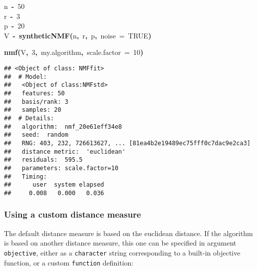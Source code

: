 \documentclass[a4paper]{article}\usepackage{graphicx, color}
\makeatletter
\newcommand{\hlnumber}[1]{\textcolor[rgb]{0,0,0}{#1}}%
\newcommand{\hlfunctioncall}[1]{\textcolor[rgb]{0.501960784313725,0,0.329411764705882}{\textbf{#1}}}%
\newcommand{\hlkeyword}[1]{\textcolor[rgb]{0,0,0}{\textbf{#1}}}%
\newcommand{\hlargument}[1]{\textcolor[rgb]{0.690196078431373,0.250980392156863,0.0196078431372549}{#1}}%
\newcommand{\hlassignement}[1]{\textcolor[rgb]{0,0,0}{\textbf{#1}}}%
\newcommand{\hlsymbol}[1]{\textcolor[rgb]{0,0,0}{#1}}%
\newcommand{\hlstd}[1]{\textcolor[rgb]{0,0,0}{#1}}%
\newenvironment{kframe}{%
 \def\FrameCommand##1{\hskip\@totalleftmargin \hskip-\fboxsep
 \colorbox{shadecolor}{##1}\hskip-\fboxsep
     \hskip-\linewidth \hskip-\@totalleftmargin \hskip\columnwidth}%
 \MakeFramed {\advance\hsize-\width
   \@totalleftmargin\z@ \linewidth\hsize
   \@setminipage}}%
 {\par\unskip\endMakeFramed}
\newenvironment{knitrout}{}{} %
\let\code=\texttt
\makeatother
\begin{document}
\begin{knitrout}
\color{fgcolor}\begin{kframe}
\begin{flushleft}
\ttfamily\noindent
\hlsymbol{n}{\ }\hlassignement{\usebox{\hlnormalsizeboxlessthan}-}{\ }\hlnumber{50}\hspace*{\fill}\\
\hlstd{}\hlsymbol{r}{\ }\hlassignement{\usebox{\hlnormalsizeboxlessthan}-}{\ }\hlnumber{3}\hspace*{\fill}\\
\hlstd{}\hlsymbol{p}{\ }\hlassignement{\usebox{\hlnormalsizeboxlessthan}-}{\ }\hlnumber{20}\hspace*{\fill}\\
\hlstd{}\hlsymbol{V}{\ }\hlassignement{\usebox{\hlnormalsizeboxlessthan}-}{\ }\hlfunctioncall{syntheticNMF}\hlkeyword{(}\hlsymbol{n}\hlkeyword{,}{\ }\hlsymbol{r}\hlkeyword{,}{\ }\hlsymbol{p}\hlkeyword{,}{\ }\hlargument{noise}{\ }\hlargument{=}{\ }\hlnumber{TRUE}\hlkeyword{)}\mbox{}
\normalfont
\end{flushleft}
\end{kframe}
\end{knitrout}


\begin{knitrout}
\color{fgcolor}\begin{kframe}
\begin{flushleft}
\ttfamily\noindent
\hlfunctioncall{nmf}\hlkeyword{(}\hlsymbol{V}\hlkeyword{,}{\ }\hlnumber{3}\hlkeyword{,}{\ }\hlsymbol{my.algorithm}\hlkeyword{,}{\ }\hlargument{scale.factor}{\ }\hlargument{=}{\ }\hlnumber{10}\hlkeyword{)}\mbox{}
\normalfont
\end{flushleft}
\begin{verbatim}
## <Object of class: NMFfit>
##  # Model:
##   <Object of class:NMFstd>
##   features: 50 
##   basis/rank: 3 
##   samples: 20 
##  # Details:
##   algorithm:  nmf_20e61eff34e8 
##   seed:  random 
##   RNG: 403, 232, 726613627, ... [81ea4b2e19489ec75fff0c7dac9e2ca3]
##   distance metric:  'euclidean' 
##   residuals:  595.5 
##   parameters: scale.factor=10 
##   Timing:
##      user  system elapsed 
##     0.008   0.000   0.036 
\end{verbatim}
\end{kframe}
\end{knitrout}


\subsubsection{Using a custom distance measure}
The default distance measure is based on the euclidean distance. 
If the algorithm is based on another distance measure, this one can be specified in argument \code{objective}, either as a \code{character} string corresponding to a built-in objective function, or a custom \code{function} definition:
\end{document}
